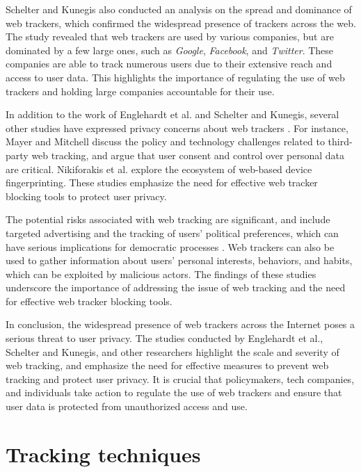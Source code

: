 Schelter and Kunegis \cite{schelter2018ubiquity} also conducted an analysis
on the spread and dominance of web trackers, which confirmed the widespread
presence of trackers across the web. The study revealed that web trackers
are used by various companies, but are dominated by a few large ones,
such as \textit{Google}, \textit{Facebook}, and \textit{Twitter}. These companies are able
to track numerous users due to their extensive reach and
access to user data. This highlights the importance of regulating 
the use of web trackers and holding large companies accountable for their use.


In addition to the work of Englehardt et al. and Schelter and Kunegis,
several other studies have expressed privacy concerns about web trackers \cite{bujlow2017survey,chaabane2012big}.
For instance, Mayer and Mitchell \cite{mayer2012third} discuss the policy and technology 
challenges related to third-party web tracking, and argue that user consent
and control over personal data are critical. Nikiforakis et al. \cite{nikiforakis2013cookieless} explore
the ecosystem of web-based device fingerprinting. These studies emphasize the need for effective
web tracker blocking tools to protect user privacy.

The potential risks associated with web tracking are significant,
and include targeted advertising and the tracking of users' political
preferences, which can have serious implications for democratic
processes \cite{englehardt2015cookies, englehardt2016online, mayer2012third}. Web trackers can also be used to gather information
about users' personal interests, behaviors, and habits, which can be
exploited by malicious actors. The findings of these studies underscore
the importance of addressing the issue of web tracking and the need
for effective web tracker blocking tools.

In conclusion, the widespread presence of web trackers across the Internet
poses a serious threat to user privacy. The studies conducted
by Englehardt et al., Schelter and Kunegis, and other researchers
highlight the scale and severity of web tracking, and emphasize
the need for effective measures to prevent web tracking and
protect user privacy. It is crucial that policymakers, tech companies,
and individuals take action to regulate the use of web trackers
and ensure that user data is protected from unauthorized access and use.


\section{Tracking techniques}


